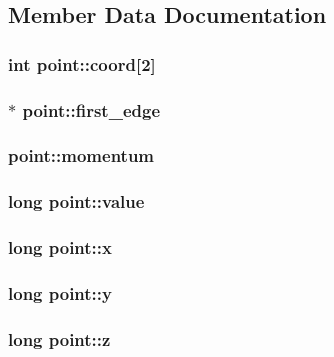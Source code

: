\subsection{Member Data Documentation}
\hypertarget{classpoint_ac1f7a98021e1edcc4532eb32d246d709}{
\subsubsection[{coord}]{\setlength{\rightskip}{0pt plus 5cm}int point\-::coord\mbox{[}2\mbox{]}}}\label{classpoint_ac1f7a98021e1edcc4532eb32d246d709}
\hypertarget{classpoint_a42a5ef5eaace74db37814dd9ff2bb297}{
\subsubsection[{first\-\_\-edge}]{$\ast$ point\-::first\-\_\-edge}}\label{classpoint_a42a5ef5eaace74db37814dd9ff2bb297}
\hypertarget{classpoint_a89fcef39f0de2459ff2d94a5e560ec06}{
\subsubsection[{momentum}]{ point\-::momentum}}\label{classpoint_a89fcef39f0de2459ff2d94a5e560ec06}
\hypertarget{classpoint_ad214d43deb0ddc77fd474f1e49616704}{
\subsubsection[{value}]{\setlength{\rightskip}{0pt plus 5cm}long point\-::value}}\label{classpoint_ad214d43deb0ddc77fd474f1e49616704}
\hypertarget{classpoint_a9787401d9164e9e22149ec551150ec95}{
\subsubsection[{x}]{\setlength{\rightskip}{0pt plus 5cm}long point\-::x}}\label{classpoint_a9787401d9164e9e22149ec551150ec95}
\hypertarget{classpoint_accac67b68e52e132de84daf4da47f30e}{
\subsubsection[{y}]{\setlength{\rightskip}{0pt plus 5cm}long point\-::y}}\label{classpoint_accac67b68e52e132de84daf4da47f30e}
\hypertarget{classpoint_a0d6460b5908f2721df965e7dbd06bdc3}{
\subsubsection[{z}]{\setlength{\rightskip}{0pt plus 5cm}long point\-::z}}\label{classpoint_a0d6460b5908f2721df965e7dbd06bdc3}


